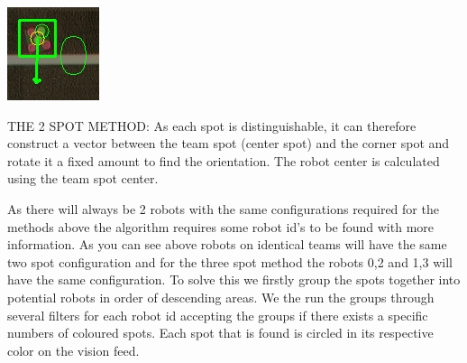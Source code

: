 \documentclass[a4paper,12pt]{article}
\begin{document}
\begin{minipage}{0.2\textwidth}
\includegraphics[scale=0.7]{2spot.jpg}
\end{minipage}
\begin{minipage}{0.8\textwidth}\raggedleft 
THE 2 SPOT METHOD: As each spot is distinguishable, it can therefore construct a vector between the team spot (center spot) and the corner spot and rotate it a fixed amount to find the orientation. The robot center is calculated using the team spot center. 
\end{minipage}\newline \newline
As there will always be 2 robots with the same configurations required for the methods above the algorithm requires some robot id's to be found with more information. As you can see above robots on identical teams will have the same two spot configuration and for the three spot method the robots 0,2 and 1,3 will have the same configuration. To solve this we firstly group the spots together into potential robots in order of descending areas. We the run the groups through several filters for each robot id accepting the groups if there exists a specific numbers of coloured spots. Each spot that is found is circled in its respective color on the vision feed.\newline\newline
\end{document}

